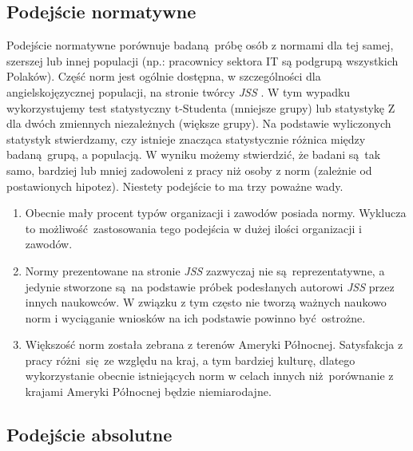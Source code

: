 \subsection{Podejście normatywne}
\label{sec:jss-calc-norm}
Podejście normatywne porównuje badaną próbę osób z normami dla tej samej, szerszej lub innej populacji (np.: pracownicy sektora IT są podgrupą wszystkich Polaków). Część norm jest ogólnie dostępna, w szczególności dla angielskojęzycznej populacji, na stronie twórcy \emph{JSS} \cite{web:jss-norms}. W tym wypadku wykorzystujemy test statystyczny t-Studenta (mniejsze grupy) lub statystykę Z dla dwóch zmiennych niezależnych (większe grupy). Na podstawie wyliczonych statystyk
stwierdzamy, czy istnieje znacząca statystycznie różnica między badaną grupą, a populacją. W wyniku możemy stwierdzić, że badani są tak samo, bardziej lub mniej zadowoleni z pracy niż osoby z norm (zależnie od postawionych hipotez). Niestety podejście to
ma trzy poważne wady.
\begin{enumerate}
\item Obecnie mały procent typów organizacji i zawodów posiada normy. Wyklucza to możliwość zastosowania tego podejścia w dużej ilości organizacji i zawodów.
\item Normy prezentowane na stronie \emph{JSS} zazwyczaj nie są reprezentatywne, a jedynie stworzone są na podstawie próbek podesłanych autorowi \emph{JSS} przez innych naukowców. W związku z tym często nie tworzą ważnych naukowo norm i wyciąganie wniosków na ich podstawie powinno być ostrożne.
\item Większość norm została zebrana z terenów Ameryki Północnej. Satysfakcja z pracy różni się ze względu na kraj, a tym bardziej kulturę, dlatego wykorzystanie obecnie istniejących norm w celach innych niż porównanie z krajami Ameryki Północnej będzie niemiarodajne.
\end{enumerate}
 
\subsection{Podejście absolutne}
\label{sec:tests-sat-abs}

